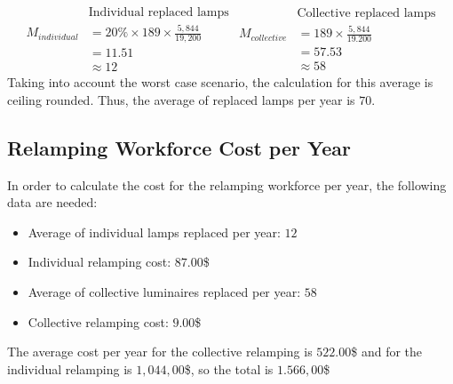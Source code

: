\begin{equation}
\begin{split}
 & \text{Individual replaced lamps} \\
M_{individual} & = 20\% \times 189 \times \frac{5,844}{19,200} \\
 & = 11.51 \\
 & \approx 12
\end{split}
\begin{split}
 & \text{Collective replaced lamps} \\
M_{collective} & = 189 \times \frac {5,844}{19.200} \\
 & = 57.53 \\
 & \approx 58
\end{split}
\label{eq:hps_relamp_average}
\end{equation}
Taking into account the worst case scenario, the calculation for this average is ceiling rounded. Thus, the average of replaced lamps per year is $70$.

\subsection{Relamping Workforce Cost per Year}
In order to calculate the cost for the relamping workforce per year, the following data are needed:
\begin{itemize}
\item Average of individual lamps replaced per year: $12$
\item Individual relamping cost: $87.00$\$
\item Average of collective luminaires replaced per year: $58$
\item Collective relamping cost: $9.00$\$
\end{itemize}

The average cost per year for the collective relamping is $522.00$\$ and for the individual relamping is $1,044,00$\$, so the total is $1.566,00$\$

